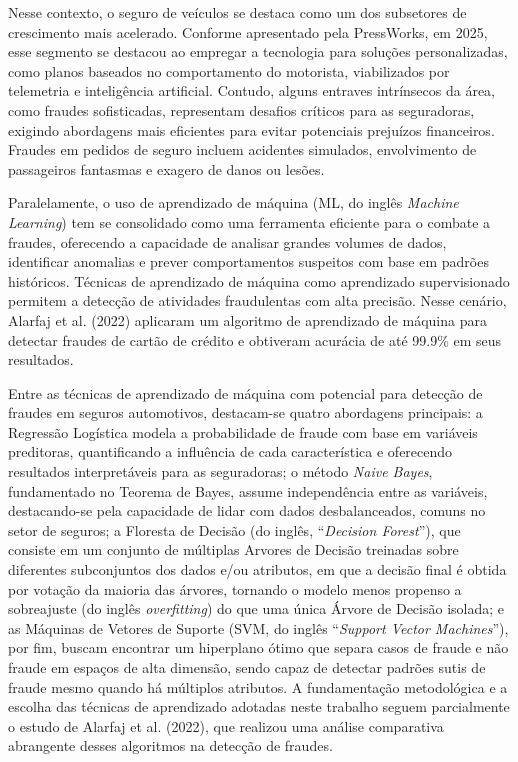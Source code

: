 \documentclass[conference]{IEEEtran}
\begin{document}
Nesse contexto, o seguro de veículos se destaca como um dos subsetores de crescimento mais acelerado. Conforme apresentado pela PressWorks\cite{b2}, em 2025, esse segmento se destacou ao empregar a tecnologia para soluções personalizadas, como planos baseados no comportamento do motorista, viabilizados por telemetria e inteligência artificial. Contudo, alguns entraves intrínsecos da área, como fraudes sofisticadas, representam desafios críticos para as seguradoras, exigindo abordagens mais eficientes para evitar potenciais prejuízos financeiros. Fraudes em pedidos de seguro incluem acidentes simulados, envolvimento de passageiros fantasmas e exagero de danos ou lesões. \cite{b3}

Paralelamente, o uso de aprendizado de máquina (ML, do inglês \textit{Machine Learning}) tem se consolidado como uma ferramenta eficiente para o combate a fraudes, oferecendo a capacidade de analisar grandes volumes de dados, identificar anomalias e prever comportamentos suspeitos com base em padrões históricos. Técnicas de aprendizado de máquina como aprendizado supervisionado permitem a detecção de atividades fraudulentas com alta precisão. Nesse cenário, Alarfaj et al. (2022) aplicaram um algoritmo de aprendizado de máquina para detectar fraudes de cartão de crédito e obtiveram acurácia de até 99.9\% em seus resultados\cite{b4}.

Entre as técnicas de aprendizado de máquina com potencial para detecção de fraudes em seguros automotivos, destacam-se quatro abordagens principais: a Regressão Logística modela a probabilidade de fraude com base em variáveis preditoras, quantificando a influência de cada característica e oferecendo resultados interpretáveis para as seguradoras; o método \textit{Naive Bayes}, fundamentado no Teorema de Bayes, assume independência entre as variáveis, destacando-se pela capacidade de lidar com dados desbalanceados, comuns no setor de seguros; a Floresta de Decisão (do inglês, ``\textit {Decision Forest}''), que consiste em um conjunto de múltiplas Arvores de Decisão treinadas sobre diferentes subconjuntos dos dados e/ou atributos, em que a decisão final é obtida por votação da maioria das árvores, tornando o modelo menos propenso a sobreajuste (do inglês \textit{overfitting}) do que uma única Árvore de Decisão isolada; e as Máquinas de Vetores de Suporte (SVM, do inglês ``\textit{Support Vector Machines}''), por fim, buscam encontrar um hiperplano ótimo que separa casos de fraude e não fraude em espaços de alta dimensão, sendo capaz de detectar padrões sutis de fraude mesmo quando há múltiplos atributos. A fundamentação metodológica e a escolha das técnicas de aprendizado adotadas neste trabalho seguem parcialmente o estudo de Alarfaj et al. (2022)\cite{b4}, que realizou uma análise comparativa abrangente desses algoritmos na detecção de fraudes.
\end{document}
